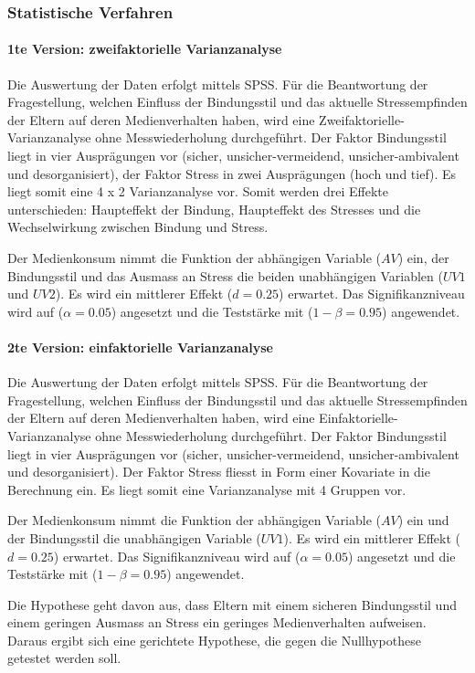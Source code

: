 \subsubsection{Statistische Verfahren}
\paragraph{1te Version: zweifaktorielle Varianzanalyse}
Die Auswertung der Daten erfolgt mittels SPSS. 
Für die Beantwortung der Fragestellung, welchen Einfluss der Bindungsstil und das aktuelle Stressempfinden der Eltern auf deren Medienverhalten haben, wird eine Zweifaktorielle-Varianzanalyse ohne Messwiederholung durchgeführt. Der Faktor Bindungsstil liegt in vier Ausprägungen vor (sicher, unsicher-vermeidend, unsicher-ambivalent und desorganisiert), der Faktor Stress in zwei Ausprägungen (hoch und tief). Es liegt somit eine 4 x 2 Varianzanalyse vor. Somit werden drei Effekte unterschieden: Haupteffekt der Bindung, Haupteffekt des Stresses und die Wechselwirkung zwischen Bindung und Stress. 

Der Medienkonsum nimmt die Funktion der abhängigen Variable ($AV$) ein, der Bindungsstil und das Ausmass an Stress die beiden unabhängigen Variablen ($UV1$ und $UV2$). Es wird ein mittlerer Effekt ($d=0.25$) erwartet. Das Signifikanzniveau wird auf ($\alpha=0.05$) angesetzt und die Teststärke mit ($1-\beta=0.95$) angewendet.

\paragraph{2te Version: einfaktorielle Varianzanalyse}
Die Auswertung der Daten erfolgt mittels SPSS. 
Für die Beantwortung der Fragestellung, welchen Einfluss der Bindungsstil und das aktuelle Stressempfinden der Eltern auf deren Medienverhalten haben, wird eine Einfaktorielle-Varianzanalyse ohne Messwiederholung durchgeführt. Der Faktor Bindungsstil liegt in vier Ausprägungen vor (sicher, unsicher-vermeidend, unsicher-ambivalent und desorganisiert). Der Faktor Stress fliesst in Form einer Kovariate in die Berechnung ein. Es liegt somit eine Varianzanalyse mit 4 Gruppen vor. 

Der Medienkonsum nimmt die Funktion der abhängigen Variable ($AV$) ein und der Bindungsstil die unabhängigen Variable ($UV1$). Es wird ein mittlerer Effekt ($d=0.25$) erwartet. Das Signifikanzniveau wird auf ($\alpha=0.05$) angesetzt und die Teststärke mit ($1-\beta=0.95$) angewendet.

Die Hypothese geht davon aus, dass Eltern mit einem sicheren Bindungsstil und einem geringen Ausmass an Stress ein geringes Medienverhalten aufweisen. Daraus ergibt sich eine gerichtete Hypothese, die gegen die Nullhypothese getestet werden soll.

